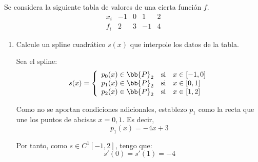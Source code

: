 \begin{ejercicio}
    Se considera la siguiente tabla de valores de una cierta función $f$.
    \begin{equation*}
        \begin{array}{c|cccc}
            x_i & -1 & 0 & 1 & 2 \\ \hline
            f_i & 2 & 3 & -1 & 4
        \end{array}
    \end{equation*}

    \begin{enumerate}
        \item Calcule un spline cuadrático $s(x)$ que interpole los datos de la tabla.
        
        Sea el spline:
        \begin{equation*}
            s(x)=\left\{\begin{array}{lll}
                p_0(x)\in \bb{P}_2 & \text{si} & x\in [-1, 0]\\
                p_1(x)\in \bb{P}_2 & \text{si} & x\in [0,1]\\
                p_2(x)\in \bb{P}_2 & \text{si} & x\in [1,2]\\
            \end{array} \right.
        \end{equation*}

        Como no se aportan condiciones adicionales, establezo $p_1$ como la recta que une los puntos de abcisas $x=0,1$. Es decir,
        \begin{equation*}
            p_1(x) = -4x+3
        \end{equation*}

        Por tanto, como $s\in C^1[-1, 2]$, tengo que:
        \begin{equation*}
            s'(0)=s'(1)=-4
        \end{equation*}


\end{enumerate}
\end{ejercicio}
